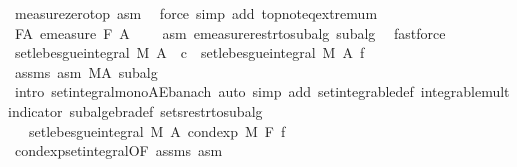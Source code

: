 \begin{isabellebody}
\ measure{\isacharunderscore}{\kern0pt}zero{\isacharunderscore}{\kern0pt}top\ asm\ \isamarkupfalse%
\ {\isacharparenleft}{\kern0pt}force\ simp\ add{\isacharcolon}{\kern0pt}\ top{\isachardot}{\kern0pt}not{\isacharunderscore}{\kern0pt}eq{\isacharunderscore}{\kern0pt}extremum{\isacharparenright}{\kern0pt}\isanewline
\ \ \ \ \isamarkupfalse%
\ F{\isacharunderscore}{\kern0pt}A{\isacharcolon}{\kern0pt}\ {\isachardoublequoteopen}emeasure\ {\isacharquery}{\kern0pt}F\ A\ {\isacharless}{\kern0pt}\ {\isasyminfinity}{\isachardoublequoteclose}\ \isamarkupfalse%
\ asm{\isacharparenleft}{\kern0pt}{}{\isacharparenright}{\kern0pt}\ emeasure{\isacharunderscore}{\kern0pt}restr{\isacharunderscore}{\kern0pt}to{\isacharunderscore}{\kern0pt}subalg\ subalg\ \isamarkupfalse%
\ fastforce\isanewline
\ \ \ \ \isamarkupfalse%
\ {\isachardoublequoteopen}set{\isacharunderscore}{\kern0pt}lebesgue{\isacharunderscore}{\kern0pt}integral\ M\ A\ {\isacharparenleft}{\kern0pt}{\isasymlambda}{\isacharunderscore}{\kern0pt}{\isachardot}{\kern0pt}\ c{\isacharparenright}{\kern0pt}\ {\isasymle}\ set{\isacharunderscore}{\kern0pt}lebesgue{\isacharunderscore}{\kern0pt}integral\ M\ A\ f{\isachardoublequoteclose}\ \isamarkupfalse%
\ assms\ asm\ M{\isacharunderscore}{\kern0pt}A\ subalg\ \isamarkupfalse%
\ {\isacharparenleft}{\kern0pt}intro\ set{\isacharunderscore}{\kern0pt}integral{\isacharunderscore}{\kern0pt}mono{\isacharunderscore}{\kern0pt}AE{\isacharunderscore}{\kern0pt}banach{\isacharcomma}{\kern0pt}\ auto\ simp\ add{\isacharcolon}{\kern0pt}\ set{\isacharunderscore}{\kern0pt}integrable{\isacharunderscore}{\kern0pt}def\ integrable{\isacharunderscore}{\kern0pt}mult{\isacharunderscore}{\kern0pt}indicator\ subalgebra{\isacharunderscore}{\kern0pt}def\ sets{\isacharunderscore}{\kern0pt}restr{\isacharunderscore}{\kern0pt}to{\isacharunderscore}{\kern0pt}subalg{\isacharparenright}{\kern0pt}\isanewline
\ \ \ \ \isamarkupfalse%
\ \isamarkupfalse%
\ {\isachardoublequoteopen}{\isachardot}{\kern0pt}{\isachardot}{\kern0pt}{\isachardot}{\kern0pt}\ {\isacharequal}{\kern0pt}\ set{\isacharunderscore}{\kern0pt}lebesgue{\isacharunderscore}{\kern0pt}integral\ M\ A\ {\isacharparenleft}{\kern0pt}cond{\isacharunderscore}{\kern0pt}exp\ M\ F\ f{\isacharparenright}{\kern0pt}{\isachardoublequoteclose}\ \isamarkupfalse%
\ cond{\isacharunderscore}{\kern0pt}exp{\isacharunderscore}{\kern0pt}set{\isacharunderscore}{\kern0pt}integral{\isacharbrackleft}{\kern0pt}OF\ assms{\isacharparenleft}{\kern0pt}{}{\isacharparenright}{\kern0pt}{\isacharbrackright}{\kern0pt}\ asm\ \isamarkupfalse%

\end{isabellebody}
